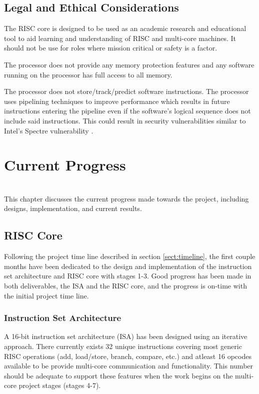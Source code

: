 \documentclass[11pt,a4paper]{report}
\begin{document}
{\section{Legal and Ethical Considerations}
The RISC core is designed to be used as an academic research and educational tool to aid learning and understanding of RISC and multi-core machines. It should not be use for roles where mission critical or safety is a factor. 

The processor does not provide any memory protection features and any software running on the processor has full access to all memory.

The processor does not store/track/predict software instructions. The processor uses pipelining techniques to improve performance which results in future instructions entering the pipeline even if the software's logical sequence does not include said instructions. This could result in security vulnerabilities similar to Intel's Spectre vulnerability \cite{kocher2018spectre}.


\chapter{Current Progress}
{%
\startcontents[chapters]
}
\noindent\\
This chapter discusses the current progress made towards the project, including designs, implementation, and current results.

\section{RISC Core}
Following the project time line described in section \ref{sect:timeline}, the first couple months have been dedicated to the design and implementation of the instruction set architecture and RISC core with stages 1-3. Good progress has been made in both deliverables, the ISA and the RISC core, and the progress is on-time with the initial project time line.

\subsection{Instruction Set Architecture}
A 16-bit instruction set architecture (ISA) has been designed using an iterative approach. There currently exists 32 unique instructions covering most generic RISC operations (add, load/store, branch, compare, etc.) and atleast 16 opcodes available to be provide multi-core communication and functionality. This number should be adequate to support these features when the work begins on the multi-core project stages (stages 4-7).

}
\end{document}

